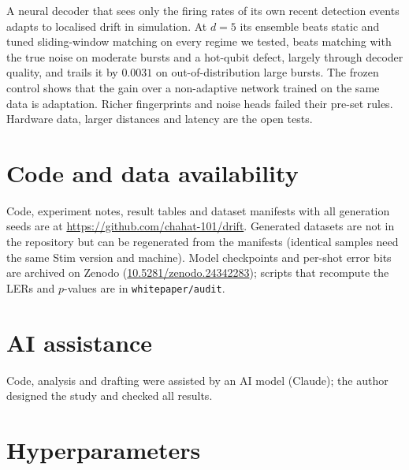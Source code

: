 \documentclass[11pt,a4paper]{article}
\newcommand{\code}[1]{\texttt{#1}}
\begin{document}
A neural decoder that sees only the firing rates of its own recent detection events adapts to localised drift in
simulation. At $d=5$ its ensemble beats static and tuned sliding-window matching on every regime we tested, beats
matching with the true noise on moderate bursts and a hot-qubit defect, largely through decoder quality, and trails it by $0.0031$ on out-of-distribution large
bursts. The frozen control shows that the gain over a non-adaptive network trained on the same data is adaptation. Richer fingerprints and noise heads failed their pre-set
rules. Hardware data, larger distances and latency are the open tests.

\section*{Code and data availability}
Code, experiment notes, result tables and dataset manifests with all generation seeds are at
\url{https://github.com/chahat-101/drift}. Generated datasets are not in the repository but can be
regenerated from the manifests (identical samples need the same Stim version and machine). Model checkpoints and
per-shot error bits are archived on Zenodo (\href{https://doi.org/10.5281/zenodo.24342283}{10.5281/zenodo.24342283}); scripts that recompute the LERs and $p$-values are
in \code{whitepaper/audit}.

\section*{AI assistance}
Code, analysis and drafting were assisted by an AI model (Claude); the author designed the study and checked all
results.

\printbibliography

\clearpage
\appendix
\section{Hyperparameters}\label{app:hyper}
\end{document}
